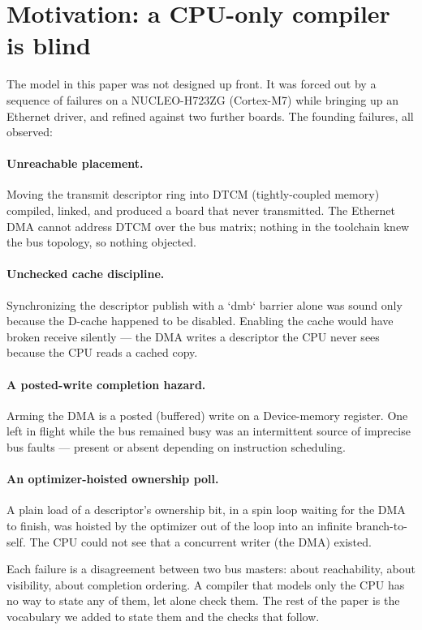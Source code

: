 \documentclass[10pt,twocolumn]{article}
\begin{document}
\section{Motivation: a CPU-only compiler is blind}
\label{sec:motivation}

The model in this paper was not designed up front. It was forced out by a
sequence of failures on a NUCLEO-H723ZG (Cortex-M7) while bringing up an
Ethernet driver, and refined against two further boards. The founding failures,
all observed:

\paragraph{Unreachable placement.} Moving the transmit descriptor ring into
DTCM (tightly-coupled memory) compiled, linked, and produced a board that never
transmitted. The Ethernet DMA cannot address DTCM over the bus matrix; nothing
in the toolchain knew the bus topology, so nothing objected.

\paragraph{Unchecked cache discipline.} Synchronizing the descriptor publish
with a `dmb` barrier alone was sound only because the D-cache happened to be
disabled. Enabling the cache would have broken receive silently --- the DMA
writes a descriptor the CPU never sees because the CPU reads a cached copy.

\paragraph{A posted-write completion hazard.} Arming the DMA is a posted
(buffered) write on a Device-memory register. One left in flight while the bus
remained busy was an intermittent source of imprecise bus faults --- present or
absent depending on instruction scheduling.

\paragraph{An optimizer-hoisted ownership poll.} A plain load of a descriptor's
ownership bit, in a spin loop waiting for the DMA to finish, was hoisted by the
optimizer out of the loop into an infinite branch-to-self. The CPU could not see
that a concurrent writer (the DMA) existed.

Each failure is a disagreement between two bus masters: about reachability,
about visibility, about completion ordering. A compiler that models only the CPU
has no way to state any of them, let alone check them. The rest of the paper is
the vocabulary we added to state them and the checks that follow.
\end{document}

